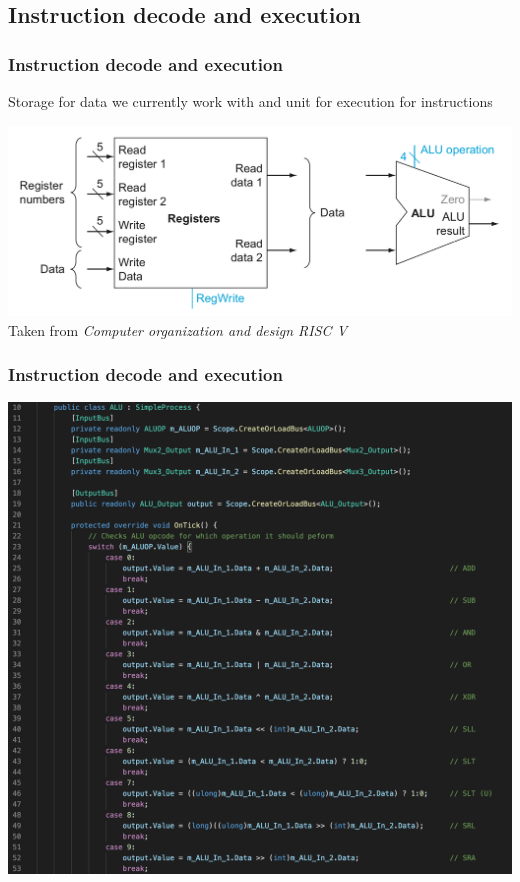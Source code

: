 \documentclass{beamer}
\begin{document}
    \begin{frame}
        \subsection{Instruction decode and execution}
        \frametitle{Instruction decode and execution}
        \centering
        \vspace{-0.5cm}
        Storage for data we currently work with and unit for execution for instructions
        
        \includegraphics[scale=0.4]{"Pictures and plots/RegALU"} \\
        \scriptsize{Taken from \textit{Computer organization and design RISC V}}
        
    \end{frame}

    \begin{frame}
        \frametitle{Instruction decode and execution}
        \centering
        \vspace{-0.2cm}
        
        \includegraphics[scale=0.25]{"Pictures and plots/ALUSME"} 
        
    \end{frame}
\end{document}
